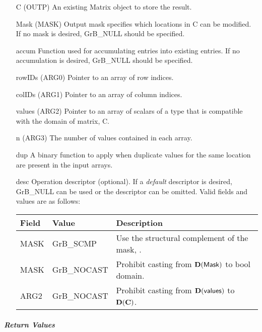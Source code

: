 \begin{itemize}[leftmargin=1.1in]
    \item[{\sf C}]      ({\sf OUTP}) An existing Matrix object to store the result.
    \item[{\sf Mask}]   ({\sf MASK}) Output mask specifies which locations in
                        {\sf C} can be modified.  If no mask is desired,
	                    {\sf GrB\_NULL} should be specified.
	\item[{\sf accum}]  Function used for accumulating entries into existing
                         entries. If no accumulation is desired,
	                    {\sf GrB\_NULL} should be specified.
	\item[{\sf rowIDs}] ({\sf ARG0}) Pointer to an array of row indices. 
	\item[{\sf colIDs}] ({\sf ARG1}) Pointer to an array of column indices. 
	\item[{\sf values}] ({\sf ARG2}) Pointer to an array of scalars of a type that
                                     is compatible with the domain of matrix, {\sf C}.
    \item[{\sf n}]      ({\sf ARG3}) The number of values contained in each array.
    \item[{\sf dup}]    A binary function to apply when duplicate values for
                        the same location are present in the input arrays.
                                     
    \item[{\sf desc}]   Operation descriptor (optional). If a
	\emph{default} descriptor is desired, {\sf GrB\_NULL} can be
	used or the descriptor can be omitted.  Valid fields and values are as follows: \\
    \begin{tabular}{lll}
    Field  & Value & Description \\
    \hline
    {\sf MASK} & {\sf GrB\_SCMP}   & Use the structural complement of the mask, . \\
    {\sf MASK} & {\sf GrB\_NOCAST} & Prohibit casting from $\bold{D}({\sf Mask})$ to {\sf bool} domain. \\
    {\sf ARG2} & {\sf GrB\_NOCAST} & Prohibit casting from $\bold{D}({\sf values})$ to $\bold{D}({\bf C})$. \\
    \end{tabular}
\end{itemize}

\subparagraph{Return Values}

